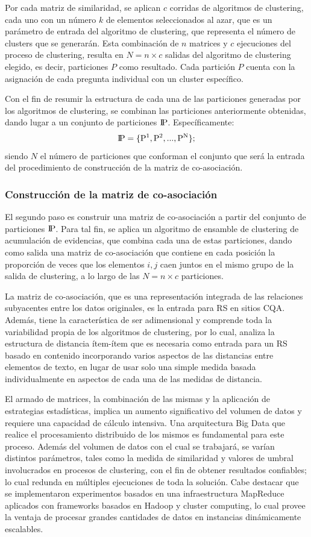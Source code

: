 \bigskip Por cada matriz de similaridad, se aplican \(c\) corridas de algoritmos de clustering, cada uno con un número \(k\) de elementos seleccionados al azar, que es un parámetro de entrada del algoritmo de clustering, que representa el número de clusters que se generarán. Esta combinación de \(n\) matrices y \(c\) ejecuciones del proceso de clustering, resulta en \(N = n \times c\) salidas del algoritmo de clustering elegido, es decir, particiones \(P\) como resultado. Cada partición \(P\) cuenta con la asignación de cada pregunta individual con un cluster específico.

\bigskip Con el fin de resumir la estructura de cada una de las particiones generadas por los algoritmos de clustering, se combinan las particiones anteriormente obtenidas, dando lugar a un conjunto de particiones  \(\rm I\!P\). Específicamente:
\[\rm I\!P = \{P^1, P^2, ..., P^N\};\]
siendo \(N\) el número de particiones que conforman el conjunto que será la entrada del procedimiento de construcción de la matriz de co-asociación.

\subsubsection{Construcción de la matriz de co-asociación}
El segundo paso es construir una matriz de co-asociación a partir del conjunto de particiones \(\rm I\!P\). Para tal fin, se aplica un algoritmo de ensamble de clustering de acumulación de evidencias, que combina cada una de estas particiones, dando como salida una matriz de co-asociación que contiene en cada posición la proporción de veces que los elementos \(i,j\) caen juntos en el mismo grupo de la salida de clustering, a lo largo de las \(N=n \times c\) particiones.

\bigskip La matriz de co-asociación, que es una representación integrada de las relaciones subyacentes entre los datos originales, es la entrada para RS en sitios CQA. Además, tiene la característica de ser adimensional y comprende toda la variabilidad propia de los algoritmos de clustering, por lo cual, analiza la estructura de distancia ítem-ítem que es necesaria como entrada para un RS basado en contenido incorporando varios aspectos de las distancias entre elementos de texto, en lugar de usar solo una simple medida basada individualmente en aspectos de cada una de las medidas de distancia.

\bigskip El armado de matrices, la combinación de las mismas y la aplicación de estrategias estadísticas, implica un aumento significativo del volumen de datos y requiere una capacidad de cálculo intensiva. Una arquitectura Big Data que realice el procesamiento distribuido de los mismos es fundamental para este proceso. Además del volumen de datos con el cual se trabajará, se varían distintos parámetros, tales como la medida de similaridad y valores de umbral involucrados en procesos de clustering, con el fin de obtener resultados confiables; lo cual redunda en múltiples ejecuciones de toda la solución. Cabe destacar que se implementaron experimentos basados en una infraestructura MapReduce aplicados con frameworks basados en Hadoop y cluster computing, lo cual provee la ventaja de procesar grandes cantidades de datos en instancias dinámicamente escalables.